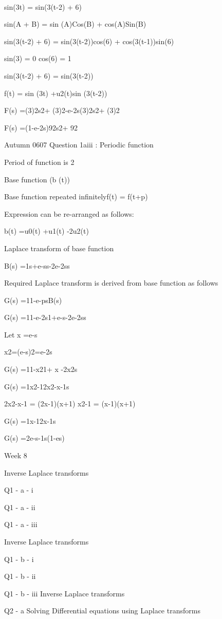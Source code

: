 



sin(3t) = sin(3(t-2) + 6)

sin(A + B) = sin (A)Cos(B) + cos(A)Sin(B) 

sin(3(t-2) + 6) = sin(3(t-2))cos(6) + cos(3(t-1))sin(6)

sin(3) = 0	           cos(6) = 1

sin(3(t-2) + 6) = sin(3(t-2))

f(t) = sin (3t) +u2(t)sin (3(t-2))

F(s) =(3)2s2+ (3)2-e-2s(3)2s2+ (3)2

F(s) =(1-e-2s)92s2+ 92
 
 
Autumn 0607 Question 1aiii : Periodic function
 
Period of function is 2
 
Base function (b (t))
 
Base function repeated infinitelyf(t) = f(t+p)

Expression can be re-arranged as follows:
 
b(t) =u0(t) +u1(t) -2u2(t) 
 
Laplace transform of base function
 
B(s) =1s+e-ss-2e-2ss 
 
 
Required Laplace transform is derived from base function as follows
 
 
G(s) =11-e-psB(s) 
 
G(s) =11-e-2s1+e-s-2e-2ss 
 
 
 
Let     x =e-s
 
        x2=(e-s)2=e-2s
 
G(s) =11-x21+ x -2x2s
 
G(s) =1x2-12x2-x-1s
 
2x2-x-1 = (2x-1)(x+1)
x2-1 = (x-1)(x+1)
 
 
G(s) =1x-12x-1s 
 
G(s) =2e-s-1s(1-es)
 
  
Week 8

Inverse Laplace transforms

Q1 - a - i

Q1 - a - ii

Q1 - a - iii

Inverse Laplace transforms

Q1 - b - i

Q1 - b - ii

Q1 - b - iii
Inverse Laplace transforms


Q2 - a
Solving Differential equations using Laplace transforms

